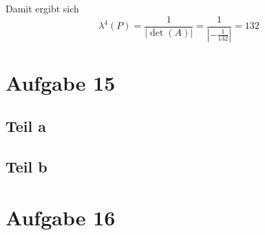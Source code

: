 \documentclass[10pt,a4paper]{article}
\begin{document}
Damit ergibt sich
\begin{equation}
  \lambda^{4}(P) = \frac{1}{|\det(A)|} = \frac{1}{|-\frac{1}{132}|} = 132
\end{equation}

\section{Aufgabe 15}

\subsection{Teil a}

\subsection{Teil b}

\section{Aufgabe 16}
\end{document}
